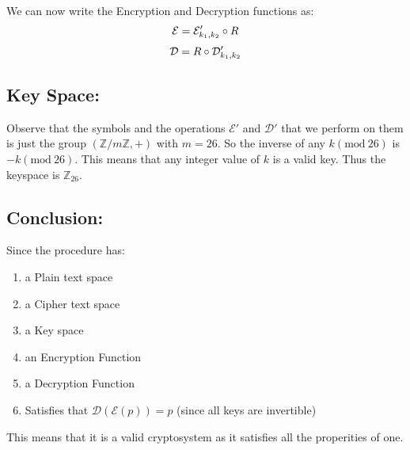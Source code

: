 \documentclass{article}
\numberwithin{equation}{subsection}
\begin{document}
	\vspace{10pt}
	We can now write the Encryption and Decryption functions as:
		\begin{equation}\notag
			\mathcal{E} = \mathcal{E}_{k_1,k_2}' \circ R				
		\end{equation}
		\begin{equation}\notag
			\mathcal{D} = R \circ \mathcal{D}_{k_1, k_2}'				
		\end{equation}
	
	\thispagestyle{fancy}


	\subsection*{Key Space:}

	Observe that the symbols and the operations $\mathcal{E}'$ and $\mathcal{D}'$ that we 
	perform on them is just the group $(\mathbb{Z}/m\mathbb{Z}, +)$ with $m=26$. So the inverse of
	any $k (\textrm{mod}\ 26)$ is $-k (\textrm{mod}\ 26)$. This means that any integer value of $k$ is a 
	valid key. Thus the keyspace is $\mathbb{Z}_{26}$.

	\vspace{20pt}
	\subsection*{Conclusion:}
	Since the procedure has:
	\begin{enumerate}
		\item a Plain text space
		\item a Cipher text space
		\item a Key space
		\item an Encryption Function
		\item a Decryption Function
		\item Satisfies that $\mathcal{D}(\mathcal{E}(p))=p$ (since all keys are invertible)
	\end{enumerate}

	This means that it is a valid cryptosystem as it satisfies all the properities of one.

	\vspace{30pt}
\end{document}
